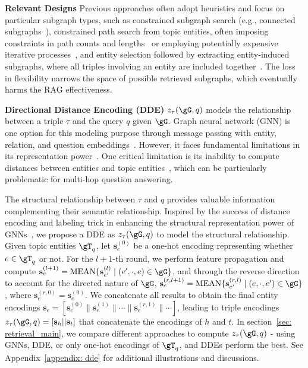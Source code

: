 \textbf{Relevant Designs} Previous approaches often adopt heuristics and focus on particular subgraph types, such as constrained subgraph search (e.g., connected subgraphs~\citep{he2024g}), constrained path search from topic entities, often imposing constraints in path counts and lengths~\citep{luo2024rog, mavromatis2024gnn} or employing potentially expensive iterative processes~\citep{zhang2022subgraph, wu2023retrieve, sun2024think, liu2024explore,  sun2024oda}, and entity selection followed by extracting entity-induced subgraphs, where all triples involving an entity are included  together~\citep{yasunaga2021qa, taunk2023grapeqa}. The loss in flexibility narrows the space of possible retrieved subgraphs, which eventually harms the RAG effectiveness.

\textbf{Directional Distance Encoding (DDE)} $z_{\tau}(\gG, q)$ models the relationship between a triple $\tau$ and the query $q$ given $\gG$. Graph neural network (GNN) is one option for this modeling purpose through message passing with entity, relation, and question embeddings~\citep{yasunaga2021qa, kang2023knowledge, mavromatis2024gnn, liu2024explore}. However, it faces fundamental limitations in its representation power~\citep{xu2018how, murphy2018janossy, 10.1609/aaai.v33i01.33014602, NEURIPS2020_75877cb7}. One critical limitation is its inability to compute distances between entities and topic entities~\citep{li2020distance}, which can be particularly problematic for multi-hop question answering.

The structural relationship between $\tau$ and $q$ provides valuable information complementing their semantic relationship.
Inspired by the success of distance encoding and labeling trick in enhancing the structural representation power of GNNs~\citep{li2020distance,zhang2021labeling}, we propose a DDE as $z_{\tau}(\gG, q)$ to model the structural relationship. Given topic entities $\gT_q$, let $\textbf{s}_e^{(0)}$ be a one-hot encoding representing whether $e\in\gT_q$ or not. For the $l+1$-th round, we perform feature propagation and compute $\textbf{s}_e^{(l+1)}=\text{MEAN}\{
    \textbf{s}_{e'}^{(l)} \mid (e', \cdot, e) \in \gG
\}$, and through the reverse direction to account for the directed nature of $\gG$, $\textbf{s}_e^{(r, l+1)}=\text{MEAN}\{
    \textbf{s}_{e'}^{(r, l)} \mid (e, \cdot, e') \in \gG
\}$, where $\textbf{s}_e^{(r, 0)}=\textbf{s}_e^{(0)}$. We concatenate all results to obtain the final entity encodings $\textbf{s}_e=[\textbf{s}_e^{(0)} \| \textbf{s}_e^{(1)}\| \cdots \| \textbf{s}_e^{(r, 1)}\| \cdots]$, leading to triple encodings $z_{\tau}(\gG, q) = [\textbf{s}_h || \textbf{s}_{t}]$ that concatenate the encodings of $h$ and $t$. In section~\ref{sec: retrieval_main}, we compare different approaches to compute $z_{\tau}(\gG, q)$ - using GNNs, DDE, or only one-hot encodings of $\gT_q$, and DDEs perform the best. See Appendix~\ref{appendix: dde} for additional illustrations and discussions.

